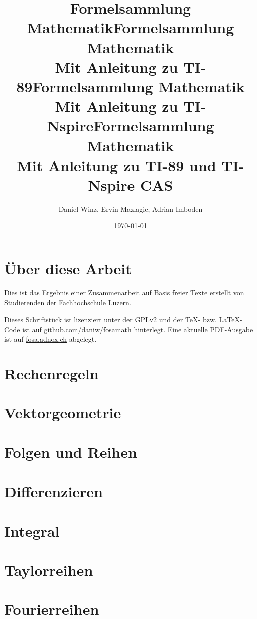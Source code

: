 \documentclass[a5paper,10pt,fleqn]{book}
\title{Formelsammlung Mathematik}
\title{Formelsammlung Mathematik \\ Mit Anleitung zu TI-89}
\title{Formelsammlung Mathematik \\ Mit Anleitung zu TI-Nspire}
\title{Formelsammlung Mathematik \\ Mit Anleitung zu TI-89 und TI-Nspire CAS}
\author{Daniel Winz, Ervin Mazlagic, Adrian Imboden}
\date{\today}
\begin{document}
\maketitle

\chapter*{Über diese Arbeit}
Dies ist das Ergebnis einer Zusammenarbeit auf Basis freier Texte erstellt von Studierenden der Fachhochschule Luzern. 

Dieses Schriftstück ist lizenziert unter der GPLv2 und der \TeX-  bzw. \LaTeX- Code ist auf \url{github.com/daniw/fosamath} hinterlegt.
Eine aktuelle PDF-Ausgabe ist auf \url{fosa.adnox.ch} abgelegt. 


\tableofcontents

\chapter{Rechenregeln}



\chapter{Vektorgeometrie}


\chapter{Folgen und Reihen}



\chapter{Differenzieren}




\chapter{Integral}


\chapter{Taylorreihen}

\chapter{Fourierreihen}



\end{document}
